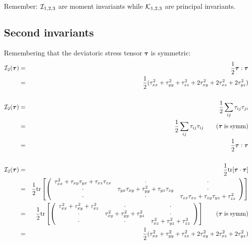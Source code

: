 
Remember: ${\cal I}_{1,2,3}$ are moment invariants while
${\cal K}_{1,2,3}$ are principal invariants.


\subsection*{Second invariants}

Remembering that the deviatoric stress tensor ${\bm \tau}$ is symmetric:
\begin{eqnarray}
{\cal I}_2(\bm\tau) 
&=& \frac12 {\bm \tau}:{\bm \tau} \nonumber\\
&=& \frac12 ( \tau_{xx}^2 + \tau_{yy}^2 +\tau_{zz}^2 + 2\tau_{xy}^2+ 2\tau_{xz}^2+ 2\tau_{yz}^2) 
\nonumber\\
\nonumber\\
{\cal I}_2(\bm\tau) 
&=& \frac12 \sum_{ij} \tau_{ij}\tau_{ji}  \nonumber\\
&=& \frac12 \sum_{ij} \tau_{ij}\tau_{ij}  \qquad (\rm{\bm\tau \; is\; symm}) \nonumber\\
&=& \frac12 {\bm \tau}:{\bm \tau} 
\nonumber\\
\nonumber\\
{\cal I}_2(\bm\tau) 
&=& \frac12 {\rm tr} [{\bm \tau}\cdot {\bm \tau}] \nonumber\\
&=& \frac{1}{2}{\rm tr} 
\left[
\left(
\begin{array}{ccc}
\tau_{xx}^2 + \tau_{xy}\tau_{yx} + \tau_{xz}\tau_{zx} & \cdot & \cdot \\
\cdot & \tau_{yx}\tau_{xy} + \tau_{yy}^2  + \tau_{yz}\tau_{zy} & \cdot  \\
\cdot & \cdot & \tau_{zx}\tau_{xz} + \tau_{zy}\tau_{yz} + \tau_{zz}^2 
\end{array}
\right)
\right] \nonumber\\
&=& \frac{1}{2}{\rm tr} 
\left[
\left(
\begin{array}{ccc}
\tau_{xx}^2 + \tau_{xy}^2 + \tau_{xz}^2 & \cdot & \cdot \\
\cdot & \tau_{xy}^2 + \tau_{yy}^2  + \tau_{yz}^2 & \cdot  \\
\cdot & \cdot & \tau_{xz}^2 + \tau_{yz}^2 + \tau_{zz}^2 
\end{array}
\right)
\right] \qquad ( \rm {\bm\tau\;  is\; symm}) \nonumber\\
&=& \frac12 ( \tau_{xx}^2 + \tau_{yy}^2 +\tau_{zz}^2 + 2\tau_{xy}^2+ 2\tau_{xz}^2+ 2\tau_{yz}^2)
\end{eqnarray}



